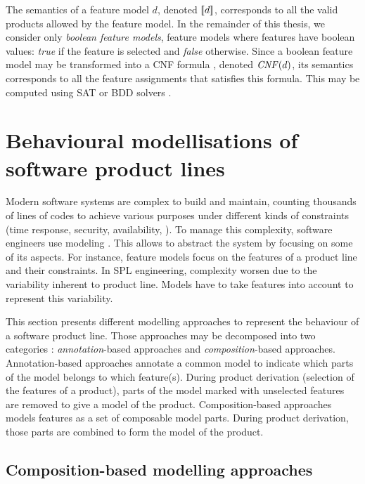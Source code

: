 The semantics of a feature model $d$, denoted $[\![ d]\!]$, corresponds to all the valid products allowed by the feature model. In the remainder of this thesis, we consider only \emph{boolean feature models}, \ie feature models where features have boolean values: \textit{true} if the feature is selected and \textit{false} otherwise. Since a boolean feature model may be transformed into a \gls{CNF} formula \cite{Batory2005}, denoted $\mathit{CNF}(d)$, its semantics corresponds to all the feature assignments that satisfies this formula. This may be computed using \gls{SAT} or \gls{BDD} solvers \cite{Liang2015,Mendonca2008}.


\section{Behavioural modellisations of software product lines}

\label{sec:splbehaviouralmodeling}

Modern software systems are complex to build and maintain, counting thousands of lines of codes to achieve various purposes under different kinds of constraints (\eg time response, security, availability, \etc). To manage this complexity, software engineers use modeling \cite{swebok2014}. This allows to abstract the system by focusing on some of its aspects. For instance, feature models focus on the features of a product line and their constraints. In \gls{SPL} engineering, complexity worsen due to the variability inherent to product line. Models have to take features into account to represent this variability.

This section presents different modelling approaches to represent the behaviour of a software product line. Those approaches may be decomposed into two categories \cite{Apel2013}: \emph{annotation}-based approaches and \emph{composition}-based approaches. Annotation-based approaches annotate a common model to indicate which parts of the model belongs to which feature(s). During product derivation (\ie selection of the features of a product), parts of the model marked with unselected features are removed to give a model of the product. Composition-based approaches models features as a set of composable model parts. During product derivation, those parts are combined to form the model of the product. 

\subsection{Composition-based modelling approaches}

